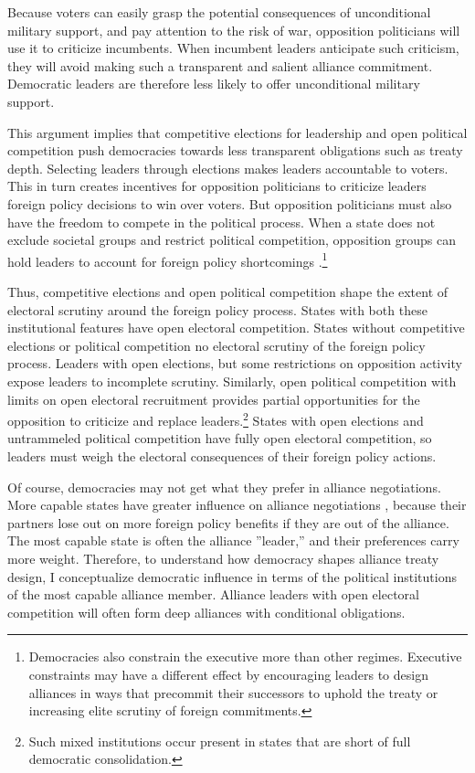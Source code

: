 \documentclass[12pt]{article}
\begin{document}
Because voters can easily grasp the potential consequences of unconditional military support, and pay attention to the risk of war, opposition politicians will use it to criticize incumbents. 
When incumbent leaders anticipate such criticism, they will avoid making such a transparent and salient alliance commitment.
Democratic leaders are therefore less likely to offer unconditional military support. 


This argument implies that competitive elections for leadership and open political competition push democracies towards less transparent obligations such as treaty depth.
Selecting leaders through elections makes leaders accountable to voters. 
This in turn creates incentives for opposition politicians to criticize leaders foreign policy decisions to win over voters. 
But opposition politicians must also have the freedom to compete in the political process.
When a state does not exclude societal groups and restrict political competition, opposition groups can hold leaders to account for foreign policy shortcomings \citep{PotterBaum2014}.\footnote{Democracies also constrain the executive more than other regimes. Executive constraints may have a different effect by encouraging leaders to design alliances in ways that precommit their successors to uphold the treaty or increasing elite scrutiny of foreign commitments.}


Thus, competitive elections and open political competition shape the extent of electoral scrutiny around the foreign policy process.
States with both these institutional features have open electoral competition. 
States without competitive elections or political competition no electoral scrutiny of the foreign policy process.
Leaders with open elections, but some restrictions on opposition activity expose leaders to incomplete scrutiny. 
Similarly, open political competition with limits on open electoral recruitment provides partial opportunities for the opposition to criticize and replace leaders.\footnote{Such mixed institutions occur present in states that are short of full democratic consolidation.}
States with open elections and untrammeled political competition have fully open electoral competition, so leaders must weigh the electoral consequences of their foreign policy actions. 


Of course, democracies may not get what they prefer in alliance negotiations. 
More capable states have greater influence on alliance negotiations \citep{Mattes2012}, because their partners lose out on more foreign policy benefits if they are out of the alliance.
The most capable state is often the alliance ''leader,'' and their preferences carry more weight. 
Therefore, to understand how democracy shapes alliance treaty design, I conceptualize democratic influence in terms of the political institutions of the most capable alliance member.
Alliance leaders with open electoral competition will often form deep alliances with conditional obligations. 
\end{document}
